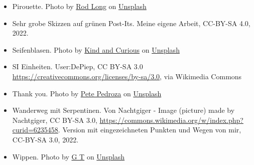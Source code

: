 \documentclass{beamer}
\begin{document}
\begin{frame}
\begin{tiny}
\begin{itemize}
  \item
Pirouette. Photo by \href{https://unsplash.com/@rodlong?utm_source=unsplash&utm_medium=referral&utm_content=creditCopyText}{Rod Long} on \href{https://unsplash.com/s/photos/figure-skater?utm_source=unsplash&utm_medium=referral&utm_content=creditCopyText}{Unsplash}  

\item
Sehr grobe Skizzen auf grünen Post-Its. Meine eigene Arbeit, CC-BY-SA 4.0, 2022.

\item
Seifenblasen. Photo by \href{https://unsplash.com/@kindandcurious?utm_source=unsplash&utm_medium=referral&utm_content=creditCopyText}{Kind and Curious} on \href{https://unsplash.com/s/photos/soap-bubble?utm_source=unsplash&utm_medium=referral&utm_content=creditCopyText}{Unsplash}  


\item
SI Einheiten. User:DePiep, CC BY-SA 3.0 \url{https://creativecommons.org/licenses/by-sa/3.0}, via Wikimedia Commons

\item
Thank you. Photo by \href{https://unsplash.com/@peet818?utm_source=unsplash&utm_medium=referral&utm_content=creditCopyText}{Pete Pedroza} on \href{https://unsplash.com/s/photos/thank-you?utm_source=unsplash&utm_medium=referral&utm_content=creditCopyText}{Unsplash}
  

\item
  
Wanderweg mit Serpentinen. Von Nachtgiger - Image (picture) made by Nachtgiger, CC BY-SA 3.0, \url{https://commons.wikimedia.org/w/index.php?curid=6235458}. Version mit eingezeichneten Punkten und Wegen von mir, CC-BY-SA 3.0, 2022.


\item
Wippen. Photo by \href{https://unsplash.com/@candyflavor89?utm_source=unsplash&utm_medium=referral&utm_content=creditCopyText}{G T} on \href{https://unsplash.com/s/photos/seesaw?utm_source=unsplash&utm_medium=referral&utm_content=creditCopyText}{Unsplash}
  

\end{itemize}
\end{tiny}
\end{frame}
\end{document}

